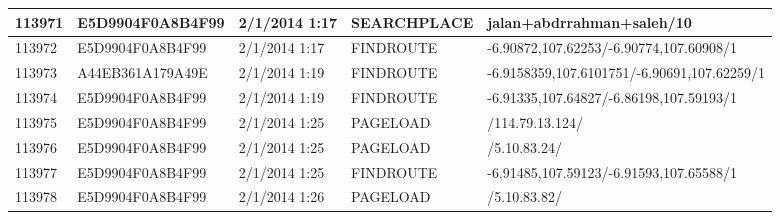 \begin{longtable}{|p{1cm}|l|l|l|p{8cm}|}
113971         & E5D9904F0A8B4F99 & 2/1/2014 1:17            & SEARCHPLACE     & jalan+abdrrahman+saleh/10                                                                                                                                                                                             \\ \hline
113972         & E5D9904F0A8B4F99 & 2/1/2014 1:17            & FINDROUTE       & -6.90872,107.62253/-6.90774,107.60908/1                                                                                                                                                                               \\ \hline
113973         & A44EB361A179A49E & 2/1/2014 1:19            & FINDROUTE       & -6.9158359,107.6101751/-6.90691,107.62259/1                                                                                                                                                                           \\ \hline
113974         & E5D9904F0A8B4F99 & 2/1/2014 1:19            & FINDROUTE       & -6.91335,107.64827/-6.86198,107.59193/1                                                                                                                                                                               \\ \hline
113975         & E5D9904F0A8B4F99 & 2/1/2014 1:25            & PAGELOAD        & /114.79.13.124/                                                                                                                                                                                                       \\ \hline
113976         & E5D9904F0A8B4F99 & 2/1/2014 1:25            & PAGELOAD        & /5.10.83.24/                                                                                                                                                                                                          \\ \hline
113977         & E5D9904F0A8B4F99 & 2/1/2014 1:25            & FINDROUTE       & -6.91485,107.59123/-6.91593,107.65588/1                                                                                                                                                                               \\ \hline
113978         & E5D9904F0A8B4F99 & 2/1/2014 1:26            & PAGELOAD        & /5.10.83.82/                                                                                                                                                                                                          \\ \hline

\end{longtable}
